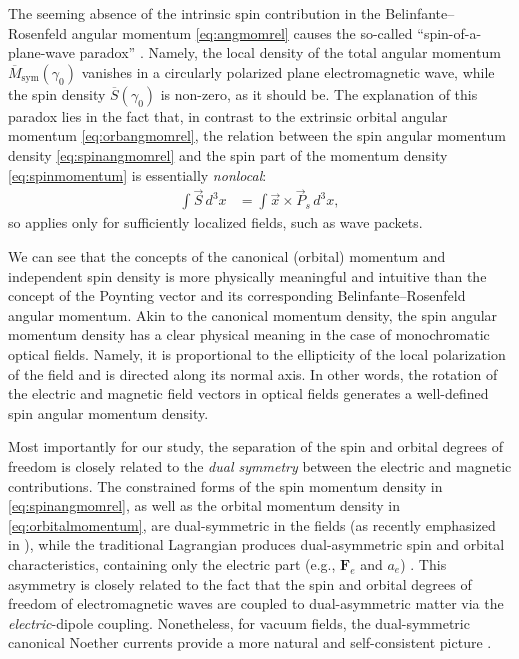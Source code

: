 \documentclass[1p,sort&compress]{elsarticle}
\numberwithin{equation}{section}
\newcommand{\rv}[1]{\vec{#1}}
\newcommand{\bv}[1]{\mathbf{#1}}
\begin{document}
The seeming absence of the intrinsic spin contribution in the Belinfante--Rosenfeld angular momentum \eqref{eq:angmomrel} causes the so-called ``spin-of-a-plane-wave paradox'' \cite{Soper1976,Ohanian1986,Mita2000,Zambrini2005,Allen2002,Bliokh2013b}. Namely, the local density of the total angular momentum $\overline{M}_{\text{sym}}(\gamma_0)$ vanishes in a circularly polarized plane electromagnetic wave, while the spin density $\overline{S}(\gamma_0)$ is non-zero, as it should be.  The explanation of this paradox lies in the fact that, in contrast to the extrinsic orbital angular momentum \eqref{eq:orbangmomrel}, the relation between the spin angular momentum density \eqref{eq:spinangmomrel} and the spin part of the momentum density \eqref{eq:spinmomentum} is essentially \emph{nonlocal}:
\begin{align}  
  \int{\rv{S}}\, d^3 x&= \int{ \rv{x}\times\rv{P}_s}\,d^3 x,
\end{align}
so applies only for sufficiently localized fields, such as wave packets. 

We can see that the concepts of the canonical (orbital) momentum and independent spin density is more physically meaningful and intuitive than the concept of the Poynting vector and its corresponding Belinfante--Rosenfeld angular momentum. Akin to the canonical momentum density, the spin angular momentum density has a clear physical meaning in the case of monochromatic optical fields. Namely, it is proportional to the ellipticity of the local polarization of the field and is directed along its normal axis. In other words, the rotation of the electric and magnetic field vectors in optical fields generates a well-defined spin angular momentum density.

Most importantly for our study, the separation of the spin and orbital degrees of freedom is closely related to the \emph{dual symmetry} between the electric and magnetic contributions. The constrained forms of the spin momentum density in \eqref{eq:spinangmomrel}, as well as the orbital momentum density in \eqref{eq:orbitalmomentum}, are dual-symmetric in the fields (as recently emphasized in \cite{Bliokh2013}), while the traditional Lagrangian produces dual-asymmetric spin and orbital characteristics, containing only the electric part (e.g., $\bv{F}_e$ and $a_e$) \cite{Soper1976,Bliokh2013}. This asymmetry is closely related to the fact that the spin and orbital degrees of freedom of electromagnetic waves are coupled to dual-asymmetric matter via the \emph{electric}-dipole coupling. Nonetheless, for vacuum fields, the dual-symmetric canonical Noether currents provide a more natural and self-consistent picture \cite{Bliokh2013}.  
\end{document}
